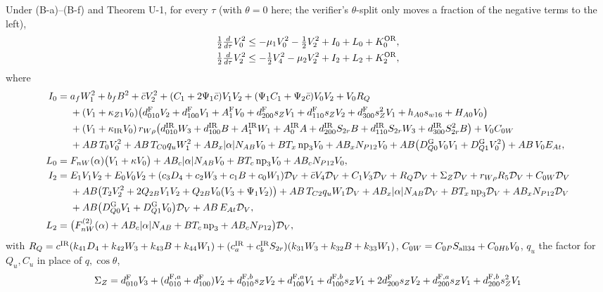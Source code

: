 \documentclass[11pt]{article}
\begin{document}
\begin{lemma}\label{EI:lem}
Under (B-a)--(B-f) and Theorem U-1, for every $\tau$ (with $\theta=0$ here; the verifier's $\theta$-split only moves a fraction of the negative terms to the left),
\begin{align*}
\tfrac12\tfrac{d}{d\tau}V_0^2&\le-\mu_1V_0^2-\tfrac12V_2^2+I_0+L_0+K_0^{\mathrm{OR}},\\
\tfrac12\tfrac{d}{d\tau}V_2^2&\le-\tfrac12V_4^2-\mu_2V_2^2+I_2+L_2+K_2^{\mathrm{OR}},
\end{align*}
where
\begin{align*}
I_0={}&a_fW_1^2+b_fB^2+\bar cV_2^2+(C_1+2\Psi_1\bar c)V_1V_2+(\Psi_1C_1+\Psi_2\bar c)V_0V_2+V_0R_Q\\
&+(V_1+\kappa_{Z1}V_0)\bigl(d^{\rm F}_{010}V_2+d^{\rm F}_{100}V_1+A_1^{\rm F}V_0+d^{\rm F}_{200}s_ZV_1+d^{\rm F}_{110}s_ZV_2+d^{\rm F}_{300}s_Z^2V_1+h_{A0}s_{w16}+H_{A0}V_0\bigr)\\
&+(V_1+\kappa_{\rm IR}V_0)\,r_{W\rho}\bigl(d^{\rm IR}_{010}W_3+d^{\rm IR}_{100}B+A_1^{\rm IR}W_1+A_0^{\rm IR}A+d^{\rm IR}_{200}S_{2r}B+d^{\rm IR}_{110}S_{2r}W_3+d^{\rm IR}_{300}S_{2r}^2B\bigr)+V_0C_{0W}\\
&+AB\,T_0V_0^2+AB\,T_{C0}q_uW_1^2+AB_x|\alpha|N_{AB}V_0+BT_x\,\mathrm{np}_3V_0+AB_xN_{P12}V_0+AB\bigl(D_{Q0}^{\rm G}V_0V_1+D_{Q1}^{\rm G}V_0^2\bigr)+AB\,V_0E_{At},\\
L_0={}&F_{nW}(\alpha)\bigl(V_1+\kappa V_0\bigr)+AB_c|\alpha|N_{AB}V_0+BT_c\,\mathrm{np}_3V_0+AB_cN_{P12}V_0,\\
I_2={}&E_1V_1V_2+E_0V_0V_2+(c_3D_4+c_2W_3+c_1B+c_0W_1)\mathcal D_V+\bar cV_4\mathcal D_V+C_1V_3\mathcal D_V+R_Q\mathcal D_V+\Sigma_Z\mathcal D_V+r_{W\rho}R_5\mathcal D_V+C_{0W}\mathcal D_V\\
&+AB\bigl(T_2V_2^2+2Q_{2B}V_1V_2+Q_{2B}V_0(V_3+\Psi_1V_2)\bigr)+AB\,T_{C2}q_uW_1\mathcal D_V+AB_x|\alpha|N_{AB}\mathcal D_V+BT_x\,\mathrm{np}_3\mathcal D_V+AB_xN_{P12}\mathcal D_V\\
&+AB\bigl(D_{Q0}^{\rm G}V_1+D_{Q1}^{\rm G}V_0\bigr)\mathcal D_V+AB\,E_{At}\mathcal D_V,\\
L_2={}&\bigl(F^{(2)}_{nW}(\alpha)+AB_c|\alpha|N_{AB}+BT_c\,\mathrm{np}_3+AB_cN_{P12}\bigr)\mathcal D_V ,
\end{align*}
with $R_Q=c^{\rm IR}(k_{41}D_4+k_{42}W_3+k_{43}B+k_{44}W_1)+(c_a^{\rm IR}+c_b^{\rm IR}S_{2r})(k_{31}W_3+k_{32}B+k_{33}W_1)$, $C_{0W}=C_{0P}S_{\rm all34}+C_{0Hb}V_0$, $q_u$ the factor for $Q_u,C_u$ in place of $q,\cos\theta$,
\begin{align*}
\Sigma_Z={}&d^{\rm F}_{010}V_3+(d^{{\rm F},a}_{010}+d^{\rm F}_{100})V_2+d^{{\rm F},b}_{010}s_ZV_2+d^{{\rm F},a}_{100}V_1+d^{{\rm F},b}_{100}s_ZV_1+2d^{\rm F}_{200}s_ZV_2+d^{{\rm F},a}_{200}s_ZV_1+d^{{\rm F},b}_{200}s_Z^2V_1\\

\end{align*}
\end{lemma}
\end{document}
